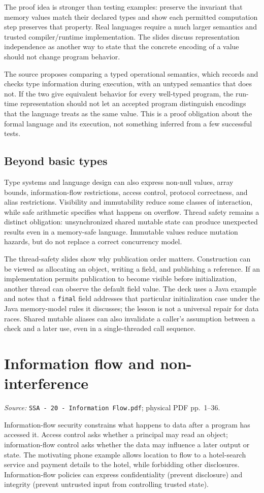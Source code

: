 \documentclass[11pt,a4paper]{article}
\newcommand{\currentmodule}{Contents}
\newcommand{\source}[2]{\textcolor{muted}{\small\textit{Source:} \nolinkurl{#1}; physical PDF pp.~#2.}\par\medskip}
\newcommand{\module}[2]{\par\Needspace{8\baselineskip}\gdef\currentmodule{#1}\section{#1}\label{#2}}
\numberwithin{figure}{section}
\begin{document}
The proof idea is stronger than testing examples: preserve the invariant that memory values match their declared types and show each permitted computation step preserves that property. Real languages require a much larger semantics and trusted compiler/runtime implementation. The slides discuss representation independence as another way to state that the concrete encoding of a value should not change program behavior.

The source proposes comparing a typed operational semantics, which records and checks type information during execution, with an untyped semantics that does not. If the two give equivalent behavior for every well-typed program, the run-time representation should not let an accepted program distinguish encodings that the language treats as the same value. This is a proof obligation about the formal language and its execution, not something inferred from a few successful tests.

\subsection{Beyond basic types}
Type systems and language design can also express non-null values, array bounds, information-flow restrictions, access control, protocol correctness, and alias restrictions. Visibility and immutability reduce some classes of interaction, while safe arithmetic specifies what happens on overflow. Thread safety remains a distinct obligation: unsynchronized shared mutable state can produce unexpected results even in a memory-safe language. Immutable values reduce mutation hazards, but do not replace a correct concurrency model.

The thread-safety slides show why publication order matters. Construction can be viewed as allocating an object, writing a field, and publishing a reference. If an implementation permits publication to become visible before initialization, another thread can observe the default field value. The deck uses a Java example and notes that a \texttt{final} field addresses that particular initialization case under the Java memory-model rules it discusses; the lesson is not a universal repair for data races. Shared mutable aliases can also invalidate a caller's assumption between a check and a later use, even in a single-threaded call sequence.

\module{Information flow and non-interference}{sec:information-flow}

\source{SSA - 20 - Information Flow.pdf}{1--36}
Information-flow security constrains what happens to data after a program has accessed it. Access control asks whether a principal may read an object; information-flow control asks whether the data may influence a later output or state. The motivating phone example allows location to flow to a hotel-search service and payment details to the hotel, while forbidding other disclosures. Information-flow policies can express confidentiality (prevent disclosure) and integrity (prevent untrusted input from controlling trusted state).
\end{document}
